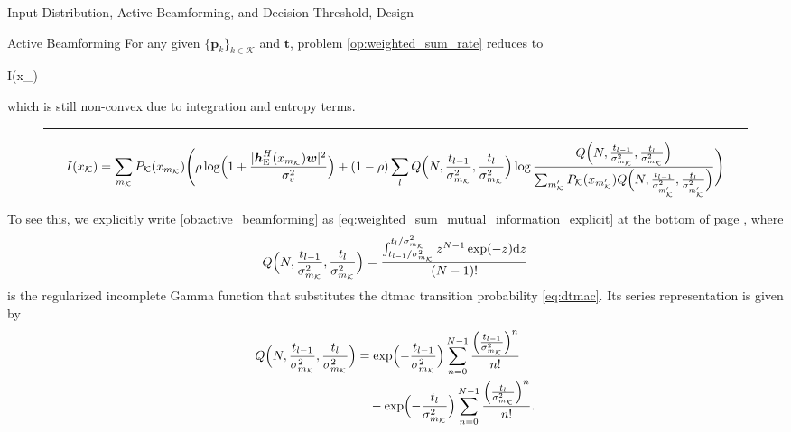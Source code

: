 \documentclass[journal]{IEEEtran}
\begin{document}
\begin{section}{Input Distribution, Active Beamforming, and Decision Threshold, Design}
	\begin{subsection}{Active Beamforming}
		For any given $\{\boldsymbol{p}_k\}_{k \in \mathcal{K}}$ and $\boldsymbol{t}$, problem \eqref{op:weighted_sum_rate} reduces to
		\begin{maxi!}
			{}{I(x_{})}{\label{op:active_beamforming}}{\label{ob:active_beamforming}}
			\addConstraint{\eqref{co:transmit_power},}
		\end{maxi!}
		which is still non-convex due to integration and entropy terms.
		\begin{figure}[!b]
			\hrule
			\begin{equation}
				I(x_{\mathcal{K}})=\sum_{m_{\mathcal{K}}}P_{\mathcal{K}}(x_{m_{\mathcal{K}}})\Biggl(\rho\log\Bigl(1+\frac{\lvert\boldsymbol{h}_{\mathrm{E}}^H(x_{m_{\mathcal{K}}})\boldsymbol{w}\rvert^2}{\sigma_v^2}\Bigr)+(1-\rho)\sum_l Q\Bigl(N,\frac{t_{l-1}}{\sigma_{m_{\mathcal{K}}}^2},\frac{t_l}{\sigma_{m_{\mathcal{K}}}^2}\Bigr) \log \frac{Q\Bigl(N,\frac{t_{l-1}}{\sigma_{m_{\mathcal{K}}}^2},\frac{t_l}{\sigma_{m_{\mathcal{K}}}^2}\Bigr)}{\sum_{m_{\mathcal{K}}'} P_{\mathcal{K}}(x_{m_{\mathcal{K}}'}) Q\Bigl(N,\frac{t_{l-1}}{\sigma_{m_{\mathcal{K}}'}^2},\frac{t_l}{\sigma_{m_{\mathcal{K}}'}^2}\Bigr)}\Biggr)
				\label{eq:weighted_sum_mutual_information_explicit}
			\end{equation}
		\end{figure}
		To see this, we explicitly write \eqref{ob:active_beamforming} as \eqref{eq:weighted_sum_mutual_information_explicit} at the bottom of page \pageref{eq:regularized_incomplete_gamma}, where
		\begin{equation}
			Q\Bigl(N,\frac{t_{l-1}}{\sigma_{m_{\mathcal{K}}}^2},\frac{t_l}{\sigma_{m_{\mathcal{K}}}^2}\Bigr) = \frac{\int_{{t_{l-1}}/{\sigma_{m_{\mathcal{K}}}^2}}^{{t_l}/{\sigma_{m_{\mathcal{K}}}^2}} z^{N-1} \exp(-z) \dd z}{(N-1)!}
			\label{eq:regularized_incomplete_gamma}
		\end{equation}
		is the regularized incomplete Gamma function that substitutes the \gls{dtmac} transition probability \eqref{eq:dtmac}.
		Its series representation is given by \cite[Theorem~3]{Jameson2016}
		\begin{align}
			Q\Bigl(N,\frac{t_{l-1}}{\sigma_{m_{\mathcal{K}}}^2},\frac{t_l}{\sigma_{m_{\mathcal{K}}}^2}\Bigr)
			 & = \exp \Bigl(-\frac{t_{l-1}}{\sigma_{m_{\mathcal{K}}}^2}\Bigr) \sum_{n=0}^{N-1} \frac{\Bigl(\frac{t_{l-1}}{\sigma_{m_{\mathcal{K}}}^2}\Bigr)^n}{n!} \nonumber \\
			 & \quad - \exp \Bigl(-\frac{t_l}{\sigma_{m_{\mathcal{K}}}^2}\Bigr) \sum_{n=0}^{N-1} \frac{\Bigl(\frac{t_l}{\sigma_{m_{\mathcal{K}}}^2}\Bigr)^n}{n!}.

\end{align}
\end{subsection}
\end{section}
\end{document}
